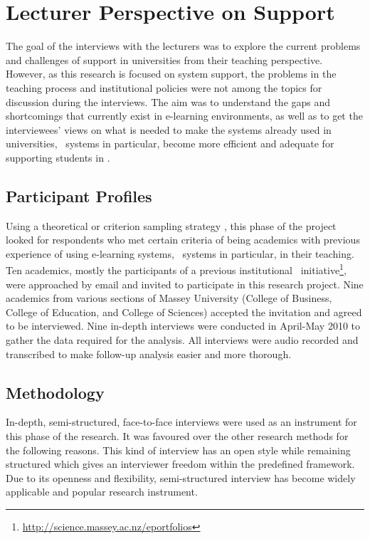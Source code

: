 \section{Lecturer Perspective on \LLLc Support}

The goal of the interviews with the lecturers was to explore the current
problems and challenges of \LLLs support in universities from their teaching
perspective. However, as this research is focused on system support, the
problems in the teaching process and institutional policies were not among the
topics for discussion during the interviews. The aim was to understand the gaps
and shortcomings that currently exist in e-learning environments, as well as to
get the interviewees' views on what is needed to make the systems already used
in universities, \ep~systems in particular, become more efficient and adequate
for supporting students in \LLLsn. 

\subsection{Participant Profiles}
Using a theoretical or criterion sampling strategy \citep{Byrne2001,
Warren2001}, this phase of the project looked for respondents who met certain
criteria of being academics with previous experience of using e-learning
systems, \ep~systems in particular, in their teaching. Ten academics, mostly the
participants of a previous institutional
\ep~initiative\footnote{\url{http://science.massey.ac.nz/eportfolios}}, were
approached by email and invited to participate in this research project. Nine
academics from various sections of Massey University (College of Business,
College of Education, and College of Sciences) accepted the invitation and
agreed to be interviewed. Nine in-depth interviews were conducted in April-May
2010 to gather the data required for the analysis. All interviews were audio
recorded and transcribed to make follow-up analysis easier and more thorough.

\subsection{Methodology}

In-depth, semi-structured, face-to-face interviews were used as an instrument
for this phase of the research. It was favoured over the other research methods
for the following reasons. This kind of interview has an open style while
remaining structured \citep{Gillham2000} which gives an interviewer freedom
within the predefined framework. Due to its openness and flexibility,
semi-structured interview has become widely applicable and popular research
instrument.

